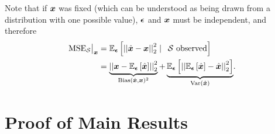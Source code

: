 Note that if $\bm{x}$ was fixed (which can be understood as being drawn from a distribution with one possible value), $\bm{\epsilon}$ and $\bm{x}$ must be independent, and therefore
\begin{align}    
\textrm{MSE}_{\set{S}}\big\vert_{\vect{x}} &= \expect[\vect{\epsilon}]{\sqnormvec{\hat{\vect{x}} - \vect{x}} \smallskip \mid \enspace \set{S} \textrm{ observed} } \\
&= {\underbrace{\sqnormvec{\vect{x} - \expect[\vect{\epsilon}]{\hat{\vect{x}}}}}_{\text{Bias}(\hat{\vect{x}},\vect{x})^{2}} + \underbrace{\expect[\vect{\epsilon}]{\sqnormvec{ \expect[\vect{\epsilon}]{\hat{\vect{x}}} - \hat{\vect{x}}}}}_{\text{Var}(\hat{\vect{x}})}}.
\end{align}

\iffalse
\section{Proof of Main Results}
\label{proof_appendix}
